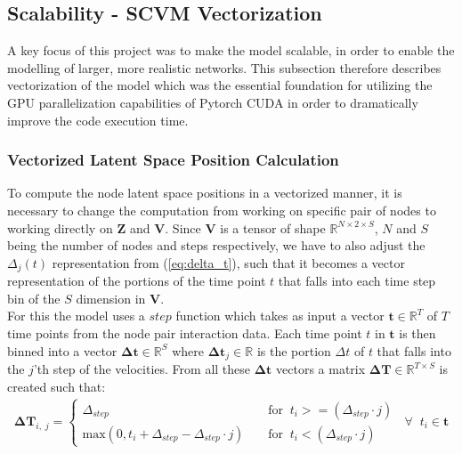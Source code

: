 \subsection{Scalability - SCVM Vectorization}
\label{sec:Method:Scalability}
A key focus of this project was to make the model scalable, in order to enable the modelling of larger, more realistic networks.
This subsection therefore describes vectorization of the model which was the essential foundation for utilizing the GPU parallelization capabilities of Pytorch CUDA\cite{CUDADocumentation} in order to dramatically improve the code execution time.

\subsubsection{Vectorized Latent Space Position Calculation}
\label{sec:Method:LatentSpacePositionCalculation}
To compute the node latent space positions in a vectorized manner, it is necessary to change the computation from working on specific pair of nodes to working directly on $\textbf{Z}$ and $\textbf{V}$. Since $\textbf{V}$ is a tensor of shape $\mathbb{R}^{N \times 2 \times S}$, $N$ and $S$ being the number of nodes and steps respectively, we have to also adjust the $\Delta_j(t)$ representation from (\ref{eq:delta_t}), such that it becomes a vector representation of the portions of the time point $t$ that falls into each time step bin of the $S$ dimension in $\textbf{V}$.
\\
For this the model uses a $step$ function which takes as input a vector $\textbf{t} \in \mathbb{R}^{T}$ of $T$  time points from the node pair interaction data. Each time point $t$ in $\textbf{t}$ is then binned into a vector $\boldsymbol{\Delta}\textbf{t} \in \mathbb{R}^{S}$ where $\boldsymbol{\Delta}\textbf{t}_j \in \mathbb{R}$ is the portion $\Delta t$ of $t$ that falls into the $j$'th step of the velocities. From all these $\boldsymbol{\Delta}\textbf{t}$ vectors a matrix $\boldsymbol{\Delta}\textbf{T} \in \mathbb{R}^{T \times S}$ is created such that:
\begin{align}
    \boldsymbol{\Delta}\textbf{T}_{i,\;j} =
    \begin{cases}
        \Delta_{step} \;\; &\text{for} \;\; t_i >= (\Delta_{step} \cdot j) \\
        \text{max}(0, t_i + \Delta_{step} - \Delta_{step} \cdot j) \;\; \;\; &\text{for} \;\; t_i < (\Delta_{step} \cdot j)
    \end{cases}
    \;\; \forall \;\; t_i \in \textbf{t}
\end{align}
